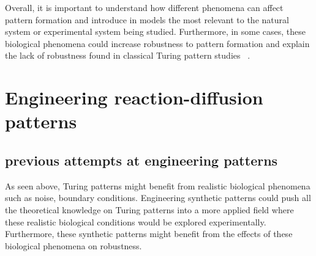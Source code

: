 Overall, it is important to understand how different phenomena can affect pattern formation and introduce in models the most relevant to the natural system or experimental system being studied.
Furthermore, in some cases, these biological phenomena could increase robustness to pattern formation and explain the lack of robustness found in classical Turing pattern studies ~\parencite{Scholes2019}.
%



\section{ Engineering reaction-diffusion patterns}
\subsection{previous attempts at engineering patterns}
As seen above, Turing patterns might benefit from realistic biological phenomena such as noise, boundary conditions\ldotsetc.
Engineering synthetic patterns could push all the theoretical knowledge on Turing patterns into a more applied field where these realistic biological conditions would be explored experimentally.
Furthermore, these synthetic patterns might benefit from the effects of these biological phenomena on robustness.

